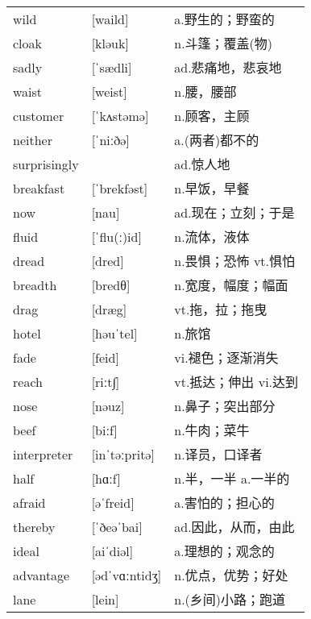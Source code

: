 \documentclass[a4paper]{article}
\begin{document}
\section{}
\begin{tabular}{l l l}

wild & [waild] & a.野生的；野蛮的 \\
cloak & [kləuk] & n.斗篷；覆盖(物) \\
sadly & [ˈsædli] & ad.悲痛地，悲哀地 \\
waist & [weist] & n.腰，腰部 \\
customer & [ˈkʌstəmə] & n.顾客，主顾 \\
neither & [ˈniːðə] & a.(两者)都不的 \\
surprisingly &  & ad.惊人地 \\
breakfast & [ˈbrekfəst] & n.早饭，早餐 \\
now & [nau] & ad.现在；立刻；于是 \\
fluid & [ˈflu(ː)id] & n.流体，液体 \\
dread & [dred] & n.畏惧；恐怖 vt.惧怕 \\
breadth & [bredθ] & n.宽度，幅度；幅面 \\
drag & [dræg] & vt.拖，拉；拖曳 \\
hotel & [həuˈtel] & n.旅馆 \\
fade & [feid] & vi.褪色；逐渐消失 \\
reach & [riːt∫] & vt.抵达；伸出 vi.达到 \\
nose & [nəuz] & n.鼻子；突出部分 \\
beef & [biːf] & n.牛肉；菜牛 \\
interpreter & [inˈtəːpritə] & n.译员，口译者 \\
half & [hɑːf] & n.半，一半 a.一半的 \\
afraid & [əˈfreid] & a.害怕的；担心的 \\
thereby & [ˈðeəˈbai] & ad.因此，从而，由此 \\
ideal & [aiˈdiəl] & a.理想的；观念的 \\
advantage & [ədˈvɑːntidʒ] & n.优点，优势；好处 \\
lane & [lein] & n.(乡间)小路；跑道 \\

\end{tabular}
\end{document}
